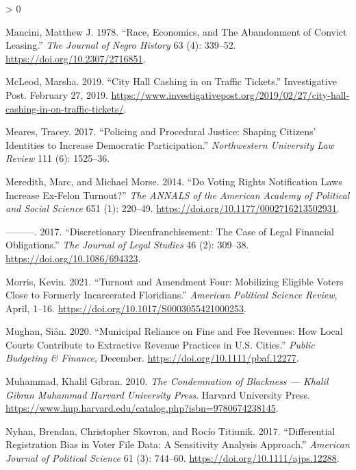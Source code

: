 \documentclass[
  12pt,
]{article}
\newlength{\cslhangindent}
\newenvironment{CSLReferences}[2] %
 {%
  \setlength{\parindent}{0pt}
  \ifodd #1 \everypar{\setlength{\hangindent}{\cslhangindent}}\ignorespaces\fi
  \ifnum #2 > 0
  \setlength{\parskip}{#2\baselineskip}
  \fi
 }%
 {}
\begin{document}
\begin{CSLReferences}{1}{0}
\leavevmode\hypertarget{ref-Mancini1978}{}%
Mancini, Matthew J. 1978. {``Race, {Economics}, and {The Abandonment} of {Convict Leasing}.''} \emph{The Journal of Negro History} 63 (4): 339--52. \url{https://doi.org/10.2307/2716851}.

\leavevmode\hypertarget{ref-McLeod2019}{}%
McLeod, Marsha. 2019. {``City {Hall} Cashing in on Traffic Tickets.''} {Investigative Post}. February 27, 2019. \url{https://www.investigativepost.org/2019/02/27/city-hall-cashing-in-on-traffic-tickets/}.

\leavevmode\hypertarget{ref-Meares2017}{}%
Meares, Tracey. 2017. {``Policing and {Procedural Justice}: {Shaping Citizens}' {Identities} to {Increase Democratic Participation}.''} \emph{Northwestern University Law Review} 111 (6): 1525--36.

\leavevmode\hypertarget{ref-Meredith2014}{}%
Meredith, Marc, and Michael Morse. 2014. {``Do {Voting Rights Notification Laws Increase Ex}-{Felon Turnout}?''} \emph{The ANNALS of the American Academy of Political and Social Science} 651 (1): 220--49. \url{https://doi.org/10.1177/0002716213502931}.

\leavevmode\hypertarget{ref-Meredith2017}{}%
---------. 2017. {``Discretionary {Disenfranchisement}: {The Case} of {Legal Financial Obligations}.''} \emph{The Journal of Legal Studies} 46 (2): 309--38. \url{https://doi.org/10.1086/694323}.

\leavevmode\hypertarget{ref-Morris2021}{}%
Morris, Kevin. 2021. {``Turnout and {Amendment Four}: {Mobilizing Eligible Voters Close} to {Formerly Incarcerated Floridians}.''} \emph{American Political Science Review}, April, 1--16. \url{https://doi.org/10.1017/S0003055421000253}.

\leavevmode\hypertarget{ref-Mughan2020}{}%
Mughan, Siân. 2020. {``Municipal {Reliance} on {Fine} and {Fee Revenues}: {How Local Courts Contribute} to {Extractive Revenue Practices} in {U}.{S}. {Cities}.''} \emph{Public Budgeting \& Finance}, December. \url{https://doi.org/10.1111/pbaf.12277}.

\leavevmode\hypertarget{ref-Muhammad2010}{}%
Muhammad, Khalil Gibran. 2010. \emph{The {Condemnation} of {Blackness} --- {Khalil Gibran Muhammad} \textbar{} {Harvard University Press}}. {Harvard University Press}. \url{https://www.hup.harvard.edu/catalog.php?isbn=9780674238145}.

\leavevmode\hypertarget{ref-Nyhan2017}{}%
Nyhan, Brendan, Christopher Skovron, and Rocío Titiunik. 2017. {``Differential {Registration Bias} in {Voter File Data}: {A Sensitivity Analysis Approach}.''} \emph{American Journal of Political Science} 61 (3): 744--60. \url{https://doi.org/10.1111/ajps.12288}.


\end{CSLReferences}
\end{document}
